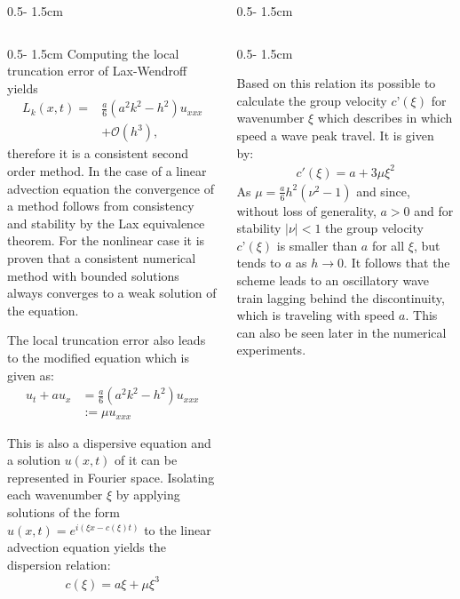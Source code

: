 \documentclass{uibposter}
\begin{document}
\begin{frame}[fragile]
\begin{columns}
\begin{column}{0.5\textwidth - 1.5cm}
\begin{column}{0.5\textwidth - 1.5cm}
\vspace{0.5cm}
Computing the local truncation error of Lax-Wendroff yields
\begin{align*}
L_k(x, t) = &\frac{a}{6}(a^2 k^2 - h^2)u_{xxx} \\
&+ \mathcal{O}(h^3) \text{,}
\end{align*}
therefore it is a consistent second order method. 
In the case of a linear advection equation the convergence of a method follows from consistency and stability by the Lax equivalence theorem. For the nonlinear case it is proven that a consistent numerical method with bounded solutions always converges to a weak solution of the equation.

\vspace{0.5cm}
The local truncation error also leads to the modified equation which is given as:
\begin{align*}
u_t + a u_x &= \frac{a}{6} (a^2 k^2 - h^2) u_{xxx}\\
&:= \mu u_{xxx}
\end{align*}

This is also a dispersive equation and a solution $u(x, t)$ of it can be represented in Fourier space. Isolating each wavenumber $\xi$ by applying solutions of the form $u(x,t) = e^{i(\xi x - c(\xi)t)}$ to the linear advection equation yields the dispersion relation:
\begin{align*}
c(\xi) = a\xi + \mu \xi^3
\end{align*}

    \end{column}
\end{column}
\begin{column}{0.5\textwidth - 1.5cm}
\begin{column}{0.5\textwidth - 1.5cm}
\vspace*{-2cm}

Based on this relation its possible to calculate the group velocity $c’(\xi)$ for wavenumber $\xi$ which describes in which speed a wave peak travel. It is given by:
\begin{align*}
c'(\xi) = a + 3\mu \xi^2
\end{align*}
As $\mu = \frac{a}{6}h^2(\nu^2 - 1)$ and since, without loss of generality, $a > 0$ and for stability $|\nu| < 1$ the group velocity $c’(\xi)$ is smaller than $a$ for all $\xi$, but tends to $a$ as $h\rightarrow0$. It follows that the scheme leads to an oscillatory wave train lagging behind the discontinuity, which is traveling with speed $a$. This can also be seen later in the numerical experiments.
    

\end{column}
\end{column}
\end{columns}
\end{frame}
\end{document}
